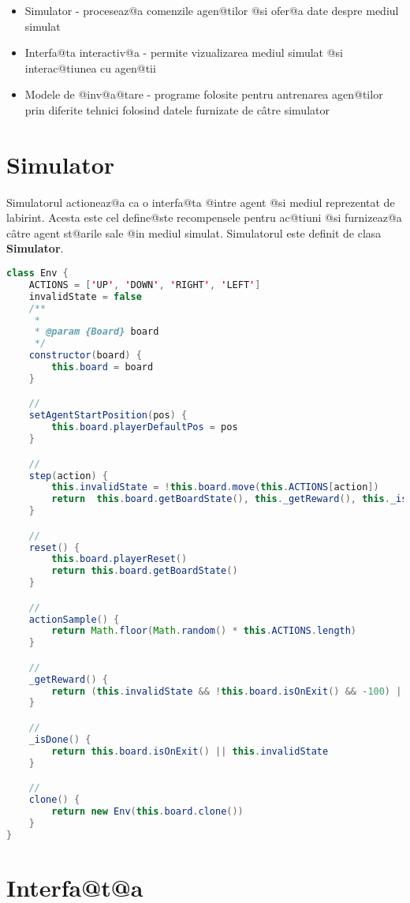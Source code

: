 \begin{itemize}
	\item Simulator - proceseaz@a comenzile agen@tilor @si ofer@a date despre mediul simulat
	\item Interfa@ta interactiv@a - permite vizualizarea mediul simulat @si interac@tiunea cu agen@tii
	\item Modele de @inv@a@tare - programe folosite pentru antrenarea agen@tilor prin diferite tehnici folosind datele furnizate de c\^ atre simulator  
\end{itemize}


\section{Simulator}

Simulatorul actioneaz@a ca o interfa@ta @intre agent @si mediul reprezentat de labirint. Acesta este cel define@ste recompensele pentru ac@tiuni @si furnizeaz@a c\^ atre agent st@arile sale @in mediul simulat. Simulatorul este definit de clasa \textbf{Simulator}.

\begin{lstlisting}[language=Java, caption=Definirea clasei Simulator]
class Env {
    ACTIONS = ['UP', 'DOWN', 'RIGHT', 'LEFT']
    invalidState = false
    /**
     * 
     * @param {Board} board 
     */
    constructor(board) {
        this.board = board
    }

    //
    setAgentStartPosition(pos) {
        this.board.playerDefaultPos = pos
    }

    // 
    step(action) {
        this.invalidState = !this.board.move(this.ACTIONS[action])
        return  this.board.getBoardState(), this._getReward(), this._isDone()]
    }

    //
    reset() {
        this.board.playerReset()
        return this.board.getBoardState()
    }

    //
    actionSample() {
        return Math.floor(Math.random() * this.ACTIONS.length)
    }

    //
    _getReward() {
        return (this.invalidState && !this.board.isOnExit() && -100) || this.board.getPlayerCellValue()
    }

    //
    _isDone() {
        return this.board.isOnExit() || this.invalidState
    }

    //
    clone() {
        return new Env(this.board.clone())
    }
}
\end{lstlisting}

\section{Interfa@t@a}

